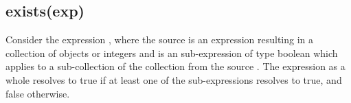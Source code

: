 
\newpage\subsection{exists(exp)}
Consider the expression , where the source  is an expression resulting in a collection of objects or integers and  is an sub-expression of type boolean which applies to a sub-collection of the collection from the source .
The expression as a whole resolves to true if at least one of the sub-expressions resolves to true, and false otherwise.

